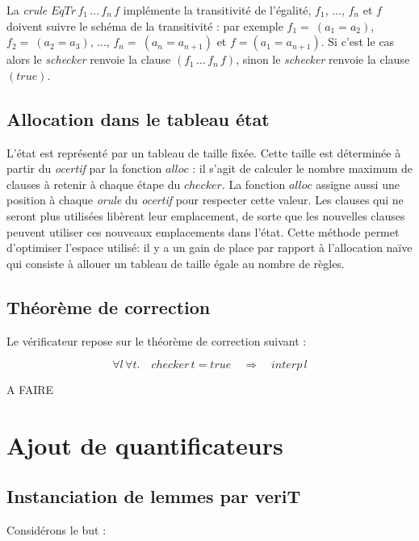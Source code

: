 \documentclass[11pt]{article}
\begin{document}
La \textit{crule} $EqTr\,f_1\,...\,f_n\,f$ implémente la transitivité de l'égalité, $f_1$, ..., $f_n$ et $f$ doivent suivre le schéma de la transitivité : par exemple $f_1 = ~(a_1=a_2)$, $f_2= ~(a_2=a_3)$, ..., $f_n=~(a_n=a_{n+1})$ et $f = (a_1 = a_{n+1})$. Si c'est le cas alors le \textit{schecker} renvoie la clause $(f_1\,...\,f_n\,f)$, sinon le \textit{schecker} renvoie la clause $(true)$.

\subsection{Allocation dans le tableau état} \label{alloc}

L'état est représenté par un tableau de taille fixée. Cette taille est déterminée à partir du \textit{ocertif} par la fonction $alloc$ : il s'agit de calculer le nombre maximum de clauses à retenir à chaque étape du $checker$. La fonction $alloc$ assigne aussi une position à chaque \textit{orule} du \textit{ocertif} pour respecter cette valeur. Les clauses qui ne seront plus utilisées libèrent leur emplacement, de sorte que les nouvelles clauses peuvent utiliser ces nouveaux emplacements dans l'état. Cette méthode permet d'optimiser l'espace utilisé: il y a un gain de place par rapport à l'allocation naïve qui consiste à allouer un tableau de taille égale au nombre de règles.


\subsection{Théorème de correction}

Le vérificateur repose sur le théorème de correction suivant :

\[ \forall l \, \forall t. \quad checker \, t = true \quad \Rightarrow \quad interp \, l \]

A FAIRE





\newpage
\section{Ajout de quantificateurs}

\subsection{Instanciation de lemmes par veriT}

Considérons le but : \\
\end{document}
